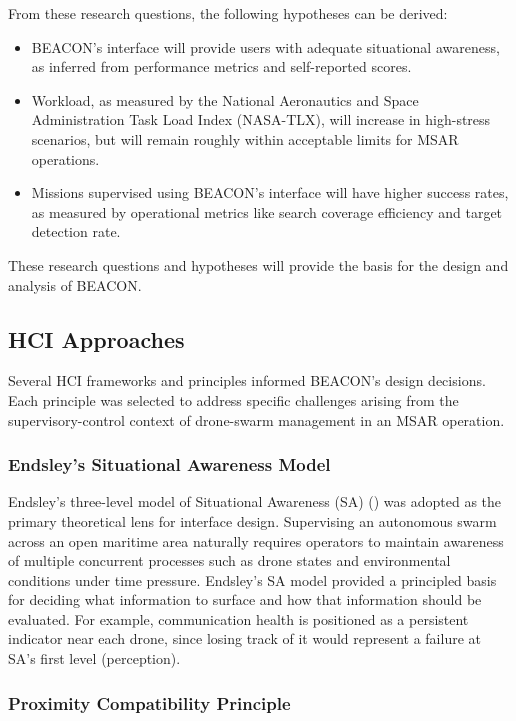 From these research questions, the following hypotheses can be derived:

\begin{itemize}
    \item BEACON's interface will provide users with adequate situational awareness, as inferred from performance metrics and self-reported scores.
    \item Workload, as measured by the National Aeronautics and Space Administration Task Load Index (NASA-TLX), will increase in high-stress scenarios, but will remain roughly within acceptable limits for MSAR operations.
    \item Missions supervised using BEACON's interface will have higher success rates, as measured by operational metrics like search coverage efficiency and target detection rate.
\end{itemize}

These research questions and hypotheses will provide the basis for the design and analysis of BEACON\@.

\subsection{HCI Approaches}\label{subsec:hci-approaches}

Several HCI frameworks and principles informed BEACON's design decisions.
Each principle was selected to address specific challenges arising from the supervisory-control context of drone-swarm management in an MSAR operation.

\subsubsection{Endsley's Situational Awareness Model}

Endsley's three-level model of Situational Awareness (SA) (\cite{situation_awareness}) was adopted as the primary theoretical lens for interface design.
Supervising an autonomous swarm across an open maritime area naturally requires operators to maintain awareness of multiple concurrent processes such as drone states and environmental conditions under time pressure.
Endsley's SA model provided a principled basis for deciding what information to surface and how that information should be evaluated.
For example, communication health is positioned as a persistent indicator near each drone, since losing track of it would represent a failure at SA's first level (perception).

\subsubsection{Proximity Compatibility Principle}

